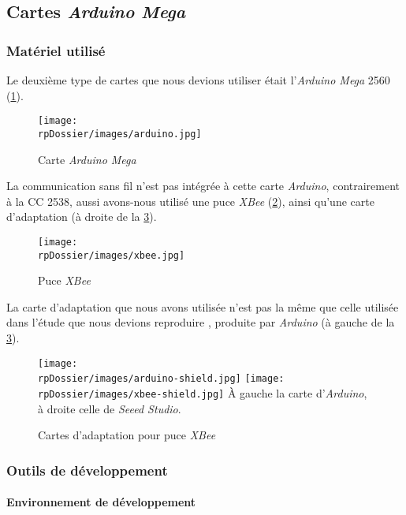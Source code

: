 \subsection{Cartes \emph{Arduino Mega}}

\subsubsection{Matériel utilisé}

Le deuxième type de cartes que nous devions utiliser était l’\emph{Arduino Mega} 2560 (\cref{arduino}).

\begin{figure}[H]
\centering
\texttt{[image: \\rpDossier/images/arduino.jpg]}
\caption{Carte \emph{Arduino Mega}}
\label{arduino}
\end{figure}

La communication sans fil n’est pas intégrée à cette carte \emph{Arduino}, contrairement à la CC 2538, aussi avons-nous utilisé une puce \emph{XBee} (\cref{xbee}), ainsi qu’une carte d’adaptation (à droite de la \cref{xbee-shields}).

\begin{figure}[H]
\centering
\texttt{[image: \\rpDossier/images/xbee.jpg]}
\caption{Puce \emph{XBee}}
\label{xbee}
\end{figure}

La carte d’adaptation que nous avons utilisée n’est pas la même que celle utilisée dans l’étude que nous devions reproduire \cite{eymery}, produite par \emph{Arduino} (à gauche de la \cref{xbee-shields}).

\begin{figure}[H]
\centering
\texttt{[image: \\rpDossier/images/arduino-shield.jpg]}
\texttt{[image: \\rpDossier/images/xbee-shield.jpg]}
\newline
À gauche la carte d’\emph{Arduino}, à droite celle de \emph{Seeed Studio}.
\caption{Cartes d’adaptation pour puce \emph{XBee}}
\label{xbee-shields}
\end{figure}

\subsubsection{Outils de développement}

\paragraph{Environnement de développement}

